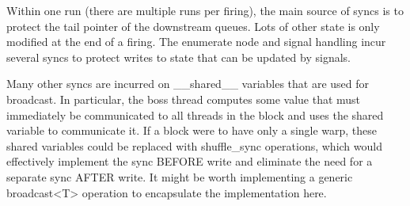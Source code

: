 Within one run (there are multiple runs per firing), the main source
of syncs is to protect the tail pointer of the downstream queues.
Lots of other state is only modified at the end of a firing.  The
enumerate node and signal handling incur several syncs to protect
writes to state that can be updated by signals.

Many other syncs are incurred on __shared__ variables that are used
for broadcast.  In particular, the boss thread computes some value
that must immediately be communicated to all threads in the block and
uses the shared variable to communicate it.  If a block were to have
only a single warp, these shared variables could be replaced with
shuffle_sync operations, which would effectively implement the sync
BEFORE write and eliminate the need for a separate sync AFTER write.
It might be worth implementing a generic broadcast<T> operation to
encapsulate the implementation here.


